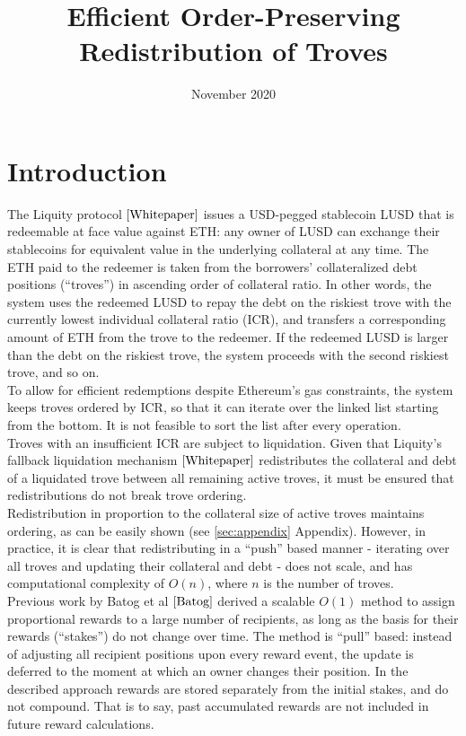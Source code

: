 \documentclass[reqno]{article}
\begin{document}
\title{\textbf{Efficient Order-Preserving Redistribution of Troves}}
\date{November 2020}
\maketitle

\tableofcontents

\section{Introduction}


The Liquity protocol $\cite{Whitepaper}$ issues a USD-pegged stablecoin LUSD that is redeemable at face value against ETH: any owner of LUSD can exchange their stablecoins for equivalent value in the underlying collateral at any time. The ETH paid to the redeemer is taken from the borrowers' collateralized debt positions (“troves”) in ascending order of collateral ratio. In other words, the system uses the redeemed LUSD to repay the debt on the riskiest trove with the currently lowest individual collateral ratio (ICR), and transfers a corresponding amount of ETH from the trove to the redeemer. If the redeemed LUSD is larger than the debt on the riskiest trove, the system proceeds with the second riskiest trove, and so on. \\

To allow for efficient redemptions despite Ethereum's gas constraints, the system keeps troves ordered by ICR, so that it can iterate over the linked list starting from the bottom. It is not feasible to sort the list after every operation. \\

Troves with an insufficient ICR are subject to liquidation. Given that Liquity's fallback liquidation mechanism $\cite{Whitepaper}$ redistributes the collateral and debt of a liquidated trove between all remaining active troves, it must be ensured that redistributions do not break trove ordering. \\

Redistribution in proportion to the collateral size of active troves maintains ordering, as can be easily shown (see \ref{sec:appendix} Appendix). However, in practice, it is clear that redistributing in a “push” based manner - iterating over all troves and updating their collateral and debt - does not scale, and has computational complexity of $O(n)$, where $n$ is the number of troves. \\

Previous work by Batog et al $\cite{Batog}$ derived a scalable $O(1)$ method to assign proportional rewards to a large number of recipients, as long as the basis for their rewards (“stakes”) do not change over time. The method is “pull” based: instead of adjusting all recipient positions upon every reward event, the update is deferred to the moment at which an owner changes their position. In the described approach rewards are stored separately from the initial stakes, and do not compound. That is to say, past accumulated rewards are not included in future reward calculations. \\
\end{document}
